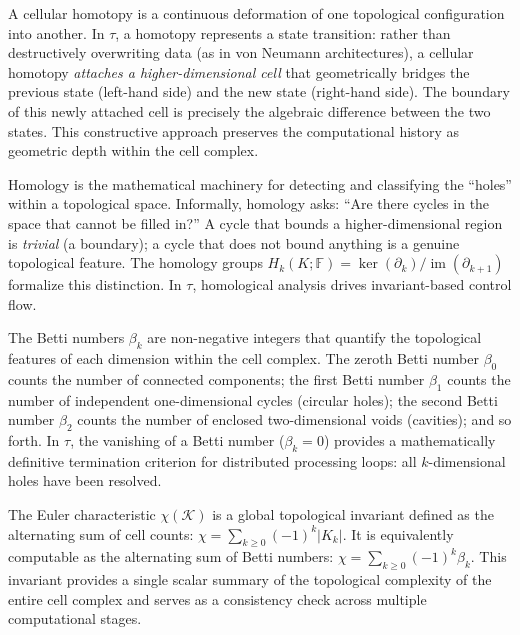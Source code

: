 \documentclass[manuscript, nonacm, review=false]{acmart}
\theoremstyle{definition}
\theoremstyle{plain}
\newcommand{\K}{\mathcal{K}}
\newcommand{\F}{\mathbb{F}}
\newcommand{\img}{\operatorname{im}}
\newcommand{\toposLang}{\ensuremath{\tau}\text{-Lang}}
\begin{document}
\begin{description}[style=unboxed, leftmargin=0cm, font=\bfseries]
\item[Cellular Homotopy]
A cellular homotopy is a continuous deformation of one topological configuration into another. In \toposLang{}, a homotopy represents a state transition: rather than destructively overwriting data (as in von Neumann architectures), a cellular homotopy \emph{attaches a higher-dimensional cell} that geometrically bridges the previous state (left-hand side) and the new state (right-hand side). The boundary of this newly attached cell is precisely the algebraic difference between the two states. This constructive approach preserves the computational history as geometric depth within the cell complex.

\item[Homology]
Homology is the mathematical machinery for detecting and classifying the ``holes'' within a topological space. Informally, homology asks: ``Are there cycles in the space that cannot be filled in?'' A cycle that bounds a higher-dimensional region is \emph{trivial} (a boundary); a cycle that does not bound anything is a genuine topological feature. The homology groups $H_k(K; \F) = \ker(\partial_k) / \img(\partial_{k+1})$ formalize this distinction. In \toposLang{}, homological analysis drives invariant-based control flow.

\item[Betti Numbers]
The Betti numbers $\beta_k$ are non-negative integers that quantify the topological features of each dimension within the cell complex. The zeroth Betti number $\beta_0$ counts the number of connected components; the first Betti number $\beta_1$ counts the number of independent one-dimensional cycles (circular holes); the second Betti number $\beta_2$ counts the number of enclosed two-dimensional voids (cavities); and so forth. In \toposLang{}, the vanishing of a Betti number ($\beta_k = 0$) provides a mathematically definitive termination criterion for distributed processing loops: all $k$-dimensional holes have been resolved.

\item[Euler Characteristic]
The Euler characteristic $\chi(\K)$ is a global topological invariant defined as the alternating sum of cell counts: $\chi = \sum_{k \geq 0} (-1)^k |K_k|$. It is equivalently computable as the alternating sum of Betti numbers: $\chi = \sum_{k \geq 0} (-1)^k \beta_k$. This invariant provides a single scalar summary of the topological complexity of the entire cell complex and serves as a consistency check across multiple computational stages.


\end{description}
\end{document}
